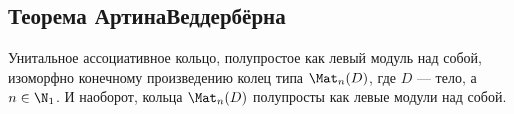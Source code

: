 \documentclass[
	extrafontsizes,
	11pt,
	hyphens,
]{memoir}
\begin{document}
%
%
%
%
%

\subsection{Теорема Артина\namedash{}Веддербёрна}

\begin{theorem}\label{thm:ArtinWedderburnExist}
Унитальное ассоциативное кольцо, полупростое как левый модуль над собой, изоморфно конечному произведению колец типа \(\Mat_n(D)\), где \(D\) --- тело, а \(n \in \N_1\). И наоборот, кольца \(\Mat_n(D)\) полупросты как левые модули над собой.
\end{theorem}
\end{document}
